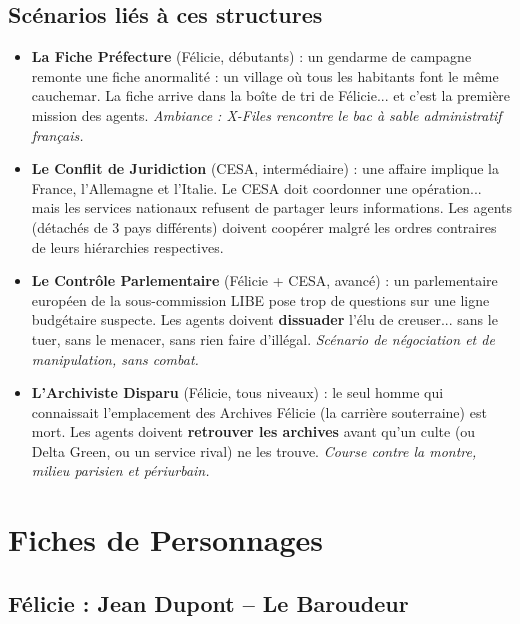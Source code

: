 \documentclass[10pt,a5paper,twoside]{book}
\begin{document}

\section{Scénarios liés à ces structures}

\begin{itemize}
\item \textbf{La Fiche Préfecture} (Félicie, débutants) : un gendarme de campagne remonte une \og fiche anormalité \fg{} : un village où tous les habitants font le même cauchemar. La fiche arrive dans la \og boîte de tri \fg{} de Félicie... et c'est la première mission des agents. \emph{Ambiance : X-Files rencontre le bac à sable administratif français.}
\item \textbf{Le Conflit de Juridiction} (CESA, intermédiaire) : une affaire implique la France, l'Allemagne et l'Italie. Le CESA doit coordonner une opération... mais les services nationaux refusent de partager leurs informations. Les agents (détachés de 3 pays différents) doivent coopérer malgré les ordres contraires de leurs hiérarchies respectives.
\item \textbf{Le Contrôle Parlementaire} (Félicie + CESA, avancé) : un parlementaire européen de la \og sous-commission LIBE \fg{} pose trop de questions sur une ligne budgétaire suspecte. Les agents doivent \textbf{dissuader} l'élu de creuser... sans le tuer, sans le menacer, sans rien faire d'illégal. \emph{Scénario de négociation et de manipulation, sans combat.}
\item \textbf{L'Archiviste Disparu} (Félicie, tous niveaux) : le seul homme qui connaissait l'emplacement des Archives Félicie (la carrière souterraine) est mort. Les agents doivent \textbf{retrouver les archives} avant qu'un culte (ou Delta Green, ou un service rival) ne les trouve. \emph{Course contre la montre, milieu parisien et périurbain.}
\end{itemize}

\newpage

\chapter{Fiches de Personnages}

\newpage

\section{Félicie : Jean Dupont -- Le Baroudeur}
\end{document}
